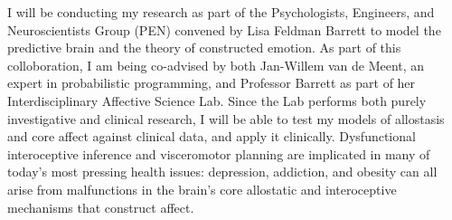 \begin{singlespace}
\im\bi
I will be conducting my research as part of the Psychologists, Engineers,
and Neuroscientists Group (PEN) convened by Lisa Feldman Barrett to model
the predictive brain and the theory of constructed emotion\cite{Barrett2015,BarrettTheoryOfConstructed2017}.
As part of this colloboration, I am being co-advised by both Jan-Willem van
de Meent, an expert in probabilistic programming, and Professor Barrett as
part of her Interdisciplinary Affective Science Lab.  Since the Lab performs
both purely investigative and clinical research, I will be able to test my
models of allostasis and core affect against clinical data, and apply it
clinically.  Dysfunctional interoceptive inference and visceromotor planning
are implicated in many of today's most pressing health issues: depression,
addiction, and obesity can all arise from malfunctions in the brain's core
allostatic and interoceptive mechanisms that construct affect\cite{Stephan2016}.
\end{singlespace}
